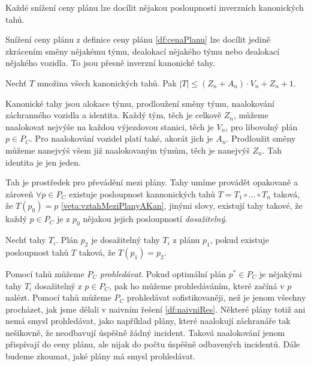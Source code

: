 \begin{veta}
  Každé snížení ceny plánu lze docílit nějakou posloupností inverzních kanonických tahů.
\end{veta}
\begin{dukaz}
  Snížení ceny plánu z definice ceny plánu \ref{df:cenaPlanu} lze docílit jedině zkrácením směny nějakému týmu, dealokací nějakého týmu nebo dealokací nějakého vozidla.
  To jsou přesně inverzní kanonické tahy.
\end{dukaz}

\begin{veta}\label{veta:pocetKanTahu}
  Nechť $T$ množina všech kanonických tahů. Pak $|T| \leq (Z_n + A_n) \cdot V_n + Z_n + 1$.
\end{veta}
\begin{dukaz}
  Kanonické tahy jsou alokace týmu, prodloužení směny týmu, naalokování záchranného vozidla a identita.
  Každý tým, těch je celkově $Z_n$, můžeme naalokovat nejvýše na každou výjezdovou stanici, těch je $V_n$, pro libovolný plán $p \in P_C$.
  Pro naalokování vozidel platí také, akorát jich je $A_n$.
  Prodloužit směny můžeme nanejvýš všem již naalokovaným týmům, těch je nanejvýš $Z_n$.
  Tah identita je jen jeden.
\end{dukaz}

Tah je prostředek pro převádění mezi plány.
Tahy umíme provádět opakovaně a zároveň $\forall p \in P_C$ existuje posloupnost kannonických tahů $T = T_1 \circ \dots \circ T_n$ taková, že $T(p_0) = p$ \ref{veta:vztahMeziPlanyAKan},
jinými slovy, existují tahy takové, že každý $p \in P_C$ je z $p_0$ nějakou jejich posloupností \textit{dosažitelný}.

\begin{definice}
  Nechť tahy $T_i$.
  Plán $p_2$ je dosažitelný tahy $T_i$ z plánu $p_1$, pokud existuje posloupnost tahů $T$ taková, že $T(p_1) = p_2$.
\end{definice}

Pomocí tahů můžeme $P_C$ \textit{prohledávat}.
Pokud optimální plán $p^* \in P_C$ je nějakými tahy $T_i$ dosažitelný z $p \in P_C$, pak ho můžeme prohledáváním, které začíná v $p$ nalézt.
Pomocí tahů můžeme $P_C$ prohledávat sofistikovaněji, než je jenom všechny procházet, jak jsme dělali v naivním řešení \ref{df:naivniRes}.
Některé plány totiž ani nemá smysl prohledávat, jako například plány, které naalokují záchranáře tak nešikovně, že neodbavují úspěšně žádný incident.
Taková naalokování jenom přispívají do ceny plánu, ale nijak do počtu úspěšně odbavených incidentů.
Dále budeme zkoumat, jaké plány má smysl prohledávat.

